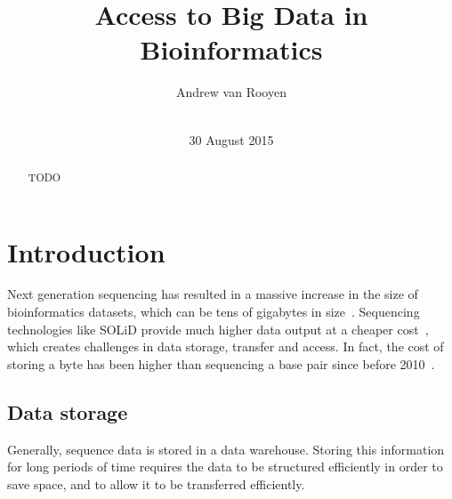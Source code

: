 \documentclass{sig-alternate-05-2015}
\begin{document}


\title{Access to Big Data in Bioinformatics}

\author{
\alignauthor
Andrew van Rooyen\\
       \\
}

\date{30 August 2015}


\maketitle
\begin{abstract}
	TODO
\end{abstract}


\section{Introduction}
Next generation sequencing has resulted in a massive increase in the size of bioinformatics datasets, which can be tens of gigabytes in size~\cite{deorowicz2011compression}. Sequencing technologies like SOLiD provide much higher data output at a cheaper cost~\cite{shendure2008next}, which creates challenges in data storage, transfer and access. In fact, the cost of storing a byte has been higher than sequencing a base pair since before 2010~\cite{baker2010next}.

\subsection{Data storage}
Generally, sequence data is stored in a data warehouse. Storing this information for long periods of time requires the data to be structured efficiently in order to save space, and to allow it to be transferred efficiently.
\end{document}
